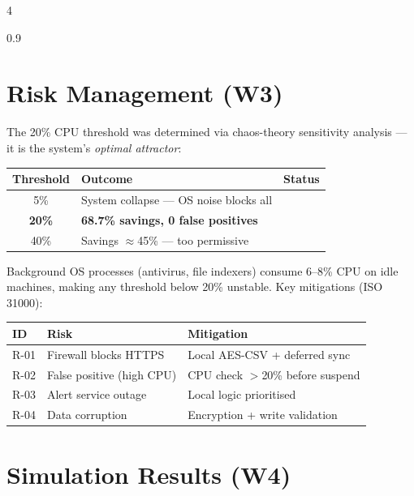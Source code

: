 \documentclass[a0,landscape]{a0poster}
\begin{document}
\begin{multicols}{4}
\begin{spacing}{0.9}

\section*{Risk Management (W3)}

{\large The 20\% CPU threshold was determined via chaos-theory sensitivity analysis — it is the system's \textit{optimal attractor}:}

\vspace{0.3cm}
\begin{center}
{\large
\begin{tabular}{@{}cll@{}}
\toprule
\textbf{Threshold} & \textbf{Outcome} & \textbf{Status} \\
\midrule
5\% & System collapse — OS noise blocks all & \color{red}{$\times$} \\
\textbf{20\%} & \textbf{68.7\% savings, 0 false positives} & \color{DarkGreen}{$\checkmark$} \\
40\% & Savings $\approx$45\% — too permissive & \color{orange}{$\sim$} \\
\bottomrule
\end{tabular}
}
\end{center}

\vspace{0.3cm}
{\large Background OS processes (antivirus, file indexers) consume 6--8\% CPU on idle machines, making any threshold below 20\% unstable. Key mitigations (ISO 31000):}

\vspace{0.2cm}
\begin{center}
{\large
\begin{tabular}{@{}p{3cm}p{3cm}p{4cm}@{}}
\toprule
\textbf{ID} & \textbf{Risk} & \textbf{Mitigation} \\
\midrule
R-01 & Firewall blocks HTTPS & Local AES-CSV + deferred sync \\
R-02 & False positive (high CPU) & CPU check $>$20\% before suspend \\
R-03 & Alert service outage & Local logic prioritised \\
R-04 & Data corruption & Encryption + write validation \\
\bottomrule
\end{tabular}
}
\end{center}

\section*{Simulation Results (W4)}


\end{spacing}
\end{multicols}
\end{document}
